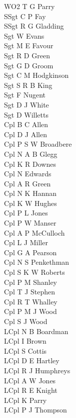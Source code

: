 \begin{multicols}{2}
  \noindent
  WO2 T G Parry \\
  SSgt C P Fay \\
  SSgt R G Gladding \\
  Sgt W Evans \\
  Sgt M E Favour \\
  Sgt R D Green \\
  Sgt G D Groom \\
  Sgt C M Hodgkinson \\
  Sgt S R B King \\
  Sgt F Nugent \\
  Sgt D J White \\
  Sgt D Willetts \\
  Cpl B C Allen \\
  Cpl D J Allen \\
  Cpl P S W Broadbere \\
  Cpl N A B Glegg \\
  Cpl K R Downes \\
  Cpl N Edwards \\
  Cpl A R Green \\
  Cpl N K Hannan \\
  Cpl K W Hughes \\
  Cpl P L Jones \\
  Cpl P W Manser \\
  Cpl A P McCulloch \\
  Cpl L J Miller \\
  Cpl G A Pearson \\
  Cpl N S Penkethman \\
  Cpl S K W Roberts \\
  Cpl P M Shanley \\
  Cpl T J Stephen \\
  Cpl R T Whalley \\
  Cpl P M J Wood \\
  Cpl S J Wood \\
  LCpl N B Boardman \\
  LCpl I Brown \\
  LCpl S Cottis \\
  LCpl D E Hartley \\
  LCpl R J Humphreys \\
  LCpl A W Jones \\
  LCpl R E Knight \\
  LCpl K Parry \\
  LCpl P J Thompson \\

\end{multicols}
